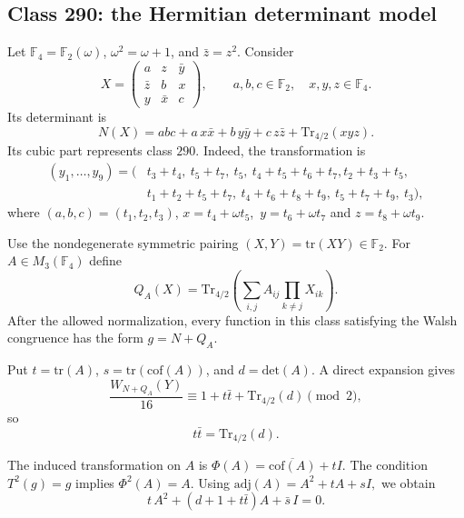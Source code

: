 \documentclass[11pt]{article}
\newtheorem{open problem}{Open problem}
\begin{document}
\begin{appendix}
\subsection{Class 290: the Hermitian determinant model}

Let $\mathbb{F}_4=\mathbb{F}_2(\omega)$, $\omega^2=\omega+1$, and $\bar z=z^2$.
Consider
\[
X=
\begin{pmatrix}
 a&z&\bar y\\
 \bar z&b&x\\
 y&\bar x&c
\end{pmatrix},
\qquad a,b,c\in \mathbb{F}_2,\quad x,y,z\in \mathbb{F}_4.
\]
Its determinant is
\begin{equation}
N(X)=abc+a\,x\bar x+b\,y\bar y+c\,z\bar z+\text{Tr}_{4/2}(xyz).
\label{eq:herm-det}
\end{equation}
Its cubic part represents class $290$. Indeed, the transformation is
\begin{align*}
(y_1,\ldots,y_9)=(&t_3+t_4,\ t_5+t_7,\ t_5,\ t_4+t_5+t_6+t_7,t_2+t_3+t_5,\\
& t_1+t_2+t_5+t_7,\ t_4+t_6+t_8+t_9,\ t_5+t_7+t_9,\ t_3),
\end{align*}
where
$(a,b,c)=(t_1,t_2,t_3)$, $x=t_4+\omega t_5$,\ $y=t_6+\omega t_7$ and $z=t_8+\omega t_9$.

Use the nondegenerate symmetric pairing
$
(X ,Y)=\text{tr}(XY)\in \mathbb{F}_2.
$
For $A\in M_3(\mathbb{F}_4)$ define
\begin{equation}
Q_A(X)=
\text{Tr}_{4/2}\left(\sum_{i,j}A_{ij}\prod_{k\ne j}X_{ik}\right).
\label{eq:herm-Q}
\end{equation}
After the allowed normalization, every function in this class satisfying the Walsh congruence has the form
$
g=N+Q_A.
$

Put
$t=\text{tr}(A)$, $s=\text{tr}(\text{cof} (A))$, and $d=\text{det}(A)$.
A direct expansion gives
\begin{equation}
\frac{W_{N+Q_A}(Y)}{16}
\equiv
1+t\bar t+\text{Tr}_{4/2}(d)
\pmod2,
\label{eq:herm-walsh}
\end{equation}
so
\begin{equation}
t\bar t=\text{Tr}_{4/2}(d).
\label{eq:herm-constraint}
\end{equation}

The induced transformation on $A$ is
$
\Phi(A)=\overline{\text{cof}(A)}+tI.
$
The condition $T^2(g)=g$ implies $\Phi^2(A)=A$. Using
$
\text{adj}(A)=A^2+tA+sI,
$
we obtain
\begin{equation}
 t\,A^2+(d+1+t\bar t)A+\bar s\,I=0.
\label{eq:herm-recip}
\end{equation}


\end{appendix}
\end{document}
